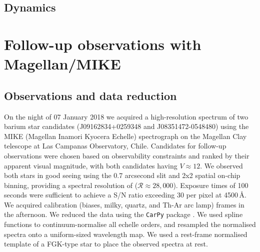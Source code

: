 \documentclass[a4paper,fleqn,usenatbib]{mnras}
\begin{document}
\subsection{Dynamics}


\section{Follow-up observations with Magellan/MIKE} \label{sec:observations}

\subsection{Observations and data reduction}
On the night of 07 January 2018 we acquired a high-resolution spectrum of two barium star candidates (J09162834+0259348 and J08351472-0548480) using the MIKE (Magellan Inamori Kyocera Echelle) \citep{bernstein2003} spectrograph on the Magellan Clay telescope \citep{schectman2003} at Las Campanas Observatory, Chile. Candidates for follow-up observations were chosen based on observability constraints and ranked by their apparent visual magnitude, with both candidates having $V \approx 12$. We observed both stars in good seeing using the 0.7 arcsecond slit and 2x2 spatial on-chip binning, providing a spectral resolution of ($\mathcal{R} \approx 28,000$). Exposure times of 100 seconds were sufficient to achieve a S/N ratio exceeding 30 per pixel at 4500\,\AA. We acquired calibration (biases, milky, quartz, and Th-Ar arc lamp) frames in the afternoon. We reduced the data using the \texttt{CarPy} package \citep{kelson2000}. We used spline functions to continuum-normalise all echelle orders, and resampled the normalised spectra onto a uniform-sized wavelength map. We used a rest-frame normalised template of a FGK-type star to place the observed spectra at rest.
\end{document}
